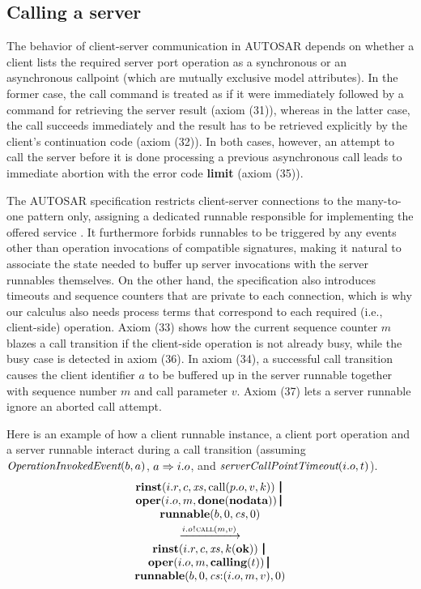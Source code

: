 \documentclass[10pt,conference]{IEEEtran}
\begin{document}
\subsection{Calling a server} \label{sect:Call}

The behavior of client-server communication in AUTOSAR \cite[ch.~4.3.2]{AR:RTE} depends on whether a client lists the required server port operation as a synchronous or an asynchronous callpoint (which are mutually exclusive model attributes). In the former case, the call command is treated as if it were immediately followed by a command for retrieving the server result (axiom (31)), whereas in the latter case, the call succeeds immediately and the result has to be retrieved explicitly by the client's continuation code (axiom (32)). In both cases, however, an attempt to call the server before it is done processing a previous asynchronous call leads to immediate abortion with the error code \textbf{limit} (axiom (35)).

The AUTOSAR specification restricts client-server connections to the many-to-one pattern only, assigning a dedicated runnable responsible for implementing the offered service \cite[ch.~4.3.2]{AR:SWC}. It furthermore forbids runnables to be triggered by any events other than operation invocations of compatible signatures, making it natural to associate the state needed to buffer up server invocations with the server runnables themselves. On the other hand, the specification also introduces timeouts \cite[ch.~4.3.2.3]{AR:RTE} and sequence counters \cite[ch.~4.3.2.6.1]{AR:RTE} that are private to each connection, which is why our calculus also needs process terms that correspond to each required (i.e., client-side) operation. Axiom (33) shows how the current sequence counter $m$ blazes a call transition if the client-side operation is not already busy, while the busy case is detected in axiom (36). In axiom (34), a successful call transition causes the client identifier $a$ to be buffered up in the server runnable together with sequence number $m$ and call parameter $v$. Axiom (37) lets a server runnable ignore an aborted call attempt.

Here is an example of how a client runnable instance, a client port operation and a server runnable interact during a call transition (assuming $\emph{OperationInvokedEvent}(b,a)$, $a \Rightarrow i.o$, and $\emph{serverCallPointTimeout}(i.o,t) $).
$$
\begin{array}{c}
  {\Trinst {i.r} c \Xs {\TrteCall {p.o} v k}} \,\Opar  \\
  {\Toper {i.o} m {\Tdone \Tnodata}} \Opar \\
  {\Trunnable b 0 \Cs 0} \vspace{0.6ex} \\
  \red{\say{i.o}{\Tcall m v}} \\
  {\Trinst {i.r} c \Xs {\Tap k \Tok}} \,\Opar \\
  {\Toper {i.o} m {\Tcalling t}} \Opar \\
  {\Trunnable b 0 {\Tcons \Cs {\Tclient {i.o} m v}}  0}
\end{array}
$$
\end{document}
